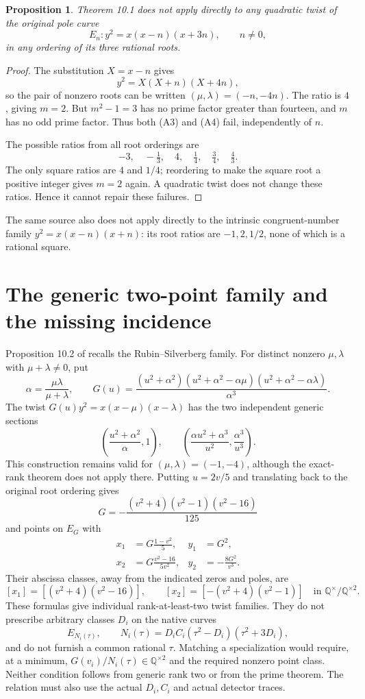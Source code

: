 \documentclass[11pt,a4paper]{article}
\newtheorem{proposition}{Proposition}
\newcommand{\Q}{\mathbb Q}
\begin{document}
\begin{proposition}
Theorem 10.1 does not apply directly to any quadratic twist of the
original pole curve
\[
 E_n:y^2=x(x-n)(x+3n),\qquad n\ne0,
\]
in any ordering of its three rational roots.
\end{proposition}
\begin{proof}
The substitution $X=x-n$ gives
\[
 y^2=X(X+n)(X+4n),
\]
so the pair of nonzero roots can be written $(\mu,\lambda)=(-n,-4n)$.
The ratio is $4$, giving $m=2$. But $m^2-1=3$ has no prime factor
greater than fourteen, and $m$ has no odd prime factor. Thus both
(A3) and (A4) fail, independently of $n$.

The possible ratios from all root orderings are
\[
 -3,\quad -\tfrac13,\quad 4,\quad \tfrac14,
 \quad\tfrac34,\quad\tfrac43.
\]
The only square ratios are $4$ and $1/4$; reordering to make the
square root a positive integer gives $m=2$ again. A quadratic twist
does not change these ratios. Hence it cannot repair these failures.
\end{proof}

The same source also does not apply directly to the intrinsic
congruent-number family $y^2=x(x-n)(x+n)$: its root ratios are
$-1,2,1/2$, none of which is a rational square.

\section{The generic two-point family and the missing incidence}

Proposition 10.2 of \cite{AW} recalls the Rubin--Silverberg family.
For distinct nonzero $\mu,\lambda$ with $\mu+\lambda\ne0$, put
\[
 \alpha=\frac{\mu\lambda}{\mu+\lambda},\qquad
 G(u)=\frac{(u^2+\alpha^2)(u^2+\alpha^2-\alpha\mu)
                    (u^2+\alpha^2-\alpha\lambda)}{\alpha^3}.
\]
The twist $G(u)y^2=x(x-\mu)(x-\lambda)$ has the two independent
generic sections
\[
 \left(\frac{u^2+\alpha^2}{\alpha},1\right),\qquad
 \left(\frac{\alpha u^2+\alpha^3}{u^2},\frac{\alpha^3}{u^3}\right).
\]
This construction remains valid for $(\mu,\lambda)=(-1,-4)$,
although the exact-rank theorem does not apply there.
Putting $u=2v/5$ and translating back to the original root ordering
gives
\[
 G=-\frac{(v^2+4)(v^2-1)(v^2-16)}{125}
\]
and points on $E_G$ with
\begin{align*}
 x_1&=G\frac{1-v^2}{5}, & y_1&=G^2,\\
 x_2&=G\frac{v^2-16}{5v^2}, & y_2&=-\frac{8G^2}{v^3}.
\end{align*}
Their abscissa classes, away from the indicated zeros and poles, are
\[
 [x_1]=[(v^2+4)(v^2-16)],\qquad
 [x_2]=[-(v^2+4)(v^2-1)]
 \quad\text{in }\Q^\times/\Q^{\times2}.
\]
These formulas give individual rank-at-least-two twist families.
They do not prescribe arbitrary classes $D_i$ on the native curves
\[
 E_{N_i(\tau)},\qquad
 N_i(\tau)=D_iC_i(\tau^2-D_i)(\tau^2+3D_i),
\]
and do not furnish a common rational $\tau$.
Matching a specialization would require, at a minimum,
$G(v_i)/N_i(\tau)\in\Q^{\times2}$ and the required nonzero point
class. Neither condition follows from generic rank two or from
the prime theorem. The relation must also use the actual $D_i,C_i$
and actual detector traces.
\end{document}
